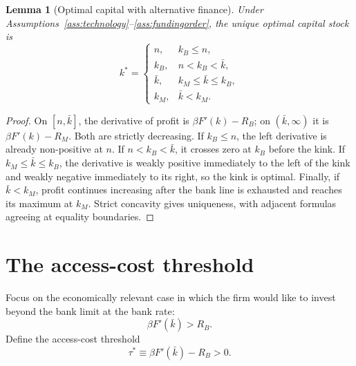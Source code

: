 \documentclass[11pt]{article}
\newtheorem{lemma}{Lemma}
\theoremstyle{definition}
\theoremstyle{remark}
\newcommand{\kb}{k_B}
\newcommand{\km}{k_M}
\newcommand{\Rb}{R_B}
\newcommand{\Rm}{R_M}
\begin{document}
\begin{lemma}[Optimal capital with alternative finance]\label{lem:policy}
Under Assumptions~\ref{ass:technology}--\ref{ass:fundingorder}, the unique
optimal capital stock is
\begin{equation}\label{eq:policy}
k^*=\begin{cases}
n, & \kb\le n,\\
\kb, & n<\kb<\bar k,\\
\bar k, & \km\le\bar k\le\kb,\\
\km, & \bar k<\km.
\end{cases}
\end{equation}
\end{lemma}

\begin{proof}
On $[n,\bar k]$, the derivative of profit is
$\beta F'(k)-\Rb$; on $(\bar k,\infty)$ it is
$\beta F'(k)-\Rm$. Both are strictly decreasing. If $\kb\le n$, the
left derivative is already non-positive at $n$. If
$n<\kb<\bar k$, it crosses zero at $\kb$ before the kink. If
$\km\le\bar k\le\kb$, the derivative is weakly positive immediately to the
left of the kink and weakly negative immediately to its right, so the kink is
optimal. Finally, if $\bar k<\km$, profit continues increasing after the bank
line is exhausted and reaches its maximum at $\km$. Strict concavity gives
uniqueness, with adjacent formulas agreeing at equality boundaries.
\end{proof}

\section{The access-cost threshold}

Focus on the economically relevant case in which the firm would like to invest
beyond the bank limit at the bank rate:
\begin{equation}\label{eq:focal-assumption}
\beta F'(\bar k)>\Rb.
\end{equation}
Define the access-cost threshold
\begin{equation}\label{eq:tau-star}
\tau^*\equiv\beta F'(\bar k)-\Rb>0.
\end{equation}
\end{document}
